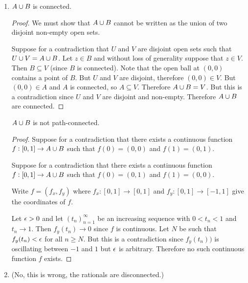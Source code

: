 \begin{enumerate}
\item
  \begin{claim*}
    $A \cup B$ is connected.
  \end{claim*}

  \begin{proof}
    We must show that $A \cup B$ cannot be written as the union of two disjoint non-empty open sets.

    Suppose for a contradiction that $U$ and $V$ are disjoint open sets such that $U \cup V = A \cup B$.
    Let $z \in B$ and without loss of generality suppose that $z \in V$. Then $B \subseteq V$ (since $B$ is
    connected). Note that the open ball at $(0, 0)$ contains a point of $B$. But $U$ and $V$ are disjoint,
    therefore $(0, 0) \in V$. But $(0, 0) \in A$ and $A$ is connected, so $A \subseteq V$.
    Therefore $A \cup B = V$. But this is a contradiction since $U$ and $V$ are disjoint and non-empty.
    Therefore $A \cup B$ are connected.
  \end{proof}


  \begin{claim*}
    $A \cup B$ is not path-connected.
  \end{claim*}

  \begin{proof}
    Suppose for a contradiction that there exists a continuous function $f: [0, 1] \to A \cup B$ such
    that $f(0) = (0, 0)$ and $f(1) = (0, 1)$.

    Suppose for a contradiction that there exists a continuous function $f: [0, 1] \to A \cup B$ such
    that $f(0) = (0, 1)$ and $f(1) = (0, 0)$.

    Write $f = (f_x, f_y)$ where $f_x: [0, 1] \to [0, 1]$ and $f_y: [0, 1] \to [-1, 1]$ give the coordinates of $f$.

    Let $\epsilon > 0$ and let $(t_n)_{n=1}^\infty$ be an increasing sequence with $0 < t_n < 1$ and $t_n \to 1$.
    Then $f_y(t_n) \to 0$ since $f$ is continuous. Let $N$ be such that $f_y(t_n) < \epsilon$ for all $n \geq N$. But
    this is a contradiction since $f_y (t_n))$ is oscillating between $-1$ and $1$ but $\epsilon$ is arbitrary.
    Therefore no such continuous function $f$ exists.
  \end{proof}
\item
  \begin{claim*}

    (No, this is wrong, the rationals are disconnected.)


\end{claim*}
\end{enumerate}
